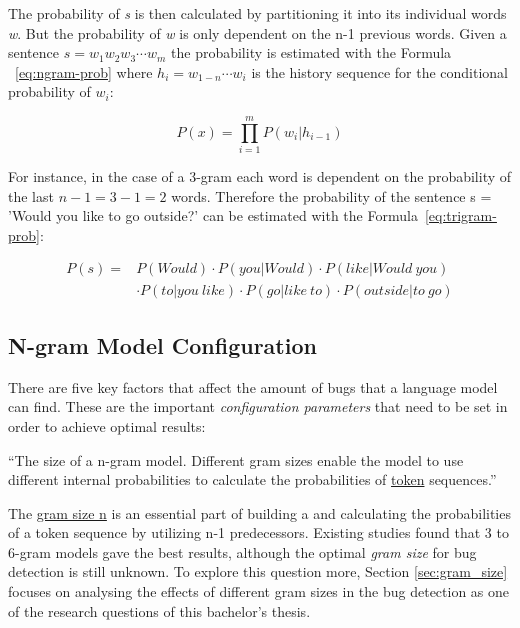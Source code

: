 The probability of \textit{s} is then calculated by partitioning it into its individual words \textit{w}. But the probability of \textit{w} is only dependent on the n-1 previous words. Given a sentence \( s = w_1w_2w_3\cdots w_m \) the probability is estimated with the Formula ~\ref{eq:ngram-prob} where \(h_i = w_{1-n}\cdots w_i \) is the history sequence for the conditional probability of \(w_i\):

\begin{equation} \label{eq:ngram-prob}
P(x) ={} \displaystyle\prod_{i=1}^{m} P(w_i|h_{i-1})
\end{equation}

For instance, in the case of a 3-gram each word is dependent on the probability of the last \(n - 1 = 3 - 1 = 2 \) words. Therefore the probability of the sentence s = 'Would you like to go outside?' can be estimated with the Formula~\ref{eq:trigram-prob}:

\begin{equation}\label{eq:trigram-prob}
\begin{aligned}
P(s) ={} & P(Would)\cdot P(you|Would)\cdot P(like|Would\ you) \\ 
		 & \cdot P(to|you\ like)\cdot P(go|like\ to)\cdot P(outside|to\ go)
\end{aligned}
\end{equation} 
  
\subsection{N-gram Model Configuration}\label{subsec:configuration}
There are five key factors that affect the amount of bugs that a language model can find. These are the important \textit{configuration parameters} that need to be set in order to achieve optimal results:  

\begin{definition}\label{def:gram_size}
    ``The size of a n-gram model. Different gram sizes enable the model to use different internal probabilities to calculate the probabilities of \hyperref[def:token]{token} sequences.''~\cite{bugram}
\end{definition}
The \hyperref[def:gram_size]{gram size n} is an essential part of building a \ngram{} and calculating the probabilities of a token sequence by utilizing n-1 predecessors. Existing studies found that 3 to 6-gram models gave the best results, although the optimal \textit{gram size} for bug detection is still unknown. To explore this question more, Section \ref{sec:gram_size} focuses on analysing the effects of different gram sizes in the \scratch{} bug detection as one of the research questions of this bachelor's thesis.


